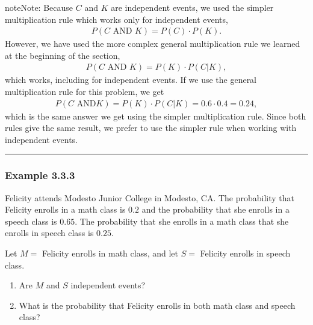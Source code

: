 \documentclass[letterpaper,10pt,english]{jupyterBook}
\begin{document}
\begin{sphinxadmonition}{note}{Note:}
\sphinxAtStartPar
Because \(C\) and \(K\) are independent events, we used the simpler multiplication rule which works only for independent events,
\begin{equation*}
\begin{split}P(C \text{ AND } K) = P(C) \cdot P(K).\end{split}
\end{equation*}
\sphinxAtStartPar
However, we  have used the more complex general multiplication rule we learned at the beginning of the section,
\begin{equation*}
\begin{split} P(C \text{ AND } K) = P(K) \cdot P(C|K), \end{split}
\end{equation*}
\sphinxAtStartPar
which  works, including for independent events. If we use the general multiplication rule for this problem, we get
\begin{equation*}
\begin{split} P(C \text{ AND} K) = P(K) \cdot P(C|K) = 0.6 \cdot 0.4 = 0.24, \end{split}
\end{equation*}
\sphinxAtStartPar
which is the same answer we get using the simpler multiplication rule. Since both rules give the same result, we prefer to use the simpler rule when working with independent events.
\end{sphinxadmonition}


\bigskip\hrule\bigskip



\subsubsection{Example 3.3.3}
\label{\detokenize{Ch3 Probability/3.3 Multiplication Rules and Independent Events:example-3-3-3}}
\sphinxAtStartPar
Felicity attends Modesto Junior College in Modesto, CA. The probability that Felicity enrolls in a math class is \(0.2\) and the probability that she enrolls in a speech class is \(0.65\). The probability that she enrolls in a math class  that she enrolls in speech class is \(0.25\).

\sphinxAtStartPar
Let \(M =\) Felicity enrolls in math class, and let \(S =\) Felicity enrolls in speech class.
\begin{enumerate}
%
\item {} 
\sphinxAtStartPar
Are \(M\) and \(S\) independent events?

\item {} 
\sphinxAtStartPar
What is the probability that Felicity enrolls in both math class and speech class?

\end{enumerate}
\end{document}
